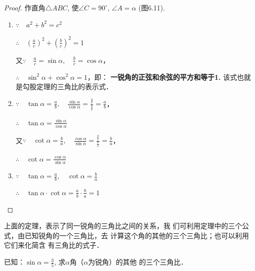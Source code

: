 \begin{proof}
    作直角$\triangle ABC$, 使$\angle C=90^{\circ}$, $\angle A=\alpha$ (图6.11).
    \begin{figure}[htp]
        \centering
        \caption{}
    \end{figure}
    
\begin{enumerate}
    \item $\because\quad  a^2+b^2=c^2$
    
    $\therefore\quad \left(\frac{a}{c}\right)^2+\left(\frac{b}{c}\right)^2=1$

    又$\because\quad \frac{a}{c}=\sin\alpha,\quad \frac{b}{c}=\cos\alpha$，

    $\therefore\quad \sin^2\alpha  +\cos^2\alpha =1$，即：
\textbf{一锐角的正弦和余弦的平方和等于1.}
该式也就是勾股定理的三角比的表示式．

\item $\because\quad \tan\alpha=\frac{a}{b},\quad \frac{\sin\alpha}{\cos\alpha}=\frac{\frac{a}{c}}{\frac{b}{c}}=\frac{a}{b}$，

$\therefore\quad \tan\alpha=\frac{\sin\alpha}{\cos\alpha}$

又$\because\quad \cot\alpha=\frac{b}{a},\quad \frac{\cos\alpha}{\sin\alpha}=\frac{\frac{b}{c}}{\frac{a}{c}}=\frac{b}{a}$，

$\therefore\quad \cot\alpha=\frac{\cos\alpha}{\sin\alpha}$

\item $\because\quad \tan\alpha=\frac{a}{b},\quad \cot\alpha=\frac{b}{a}$

$\therefore\quad \tan\alpha\cdot \cot\alpha=\frac{a}{b}\cdot \frac{b}{a}=1$
\end{enumerate}
\end{proof}

上面的定理，表示了同一锐角的三角比之间的关系，我
们可利用定理中的三个公式，由已知锐角的一个三角比，去
计算这个角的其他的三个三角比；也可以利用它们来化简含
有三角比的式子．


\begin{example}
    已知：$\sin\alpha=\frac{3}{5}$, 
    求$\alpha$角（$\alpha$为锐角）的其他
    的三个三角比．
\end{example}


